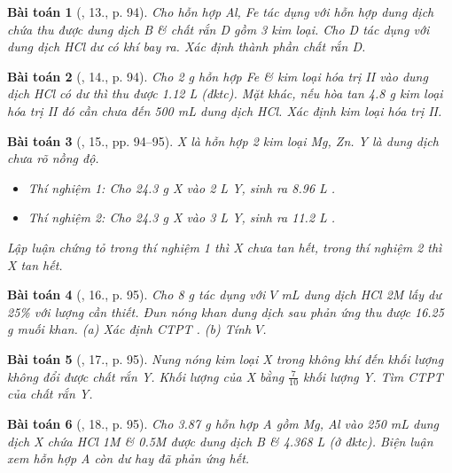 \documentclass{article}
\newtheorem{baitoan}{Bài toán}
\begin{document}
\begin{baitoan}[\cite{An_Hoa_Hoc_nang_cao_8_9}, 13., p. 94]
	Cho hỗn hợp {\rm Al, Fe} tác dụng với hỗn hợp dung dịch chứa {\rm{}} thu được dung dịch B \& chất rắn D gồm 3 kim loại. Cho D tác dụng với dung dịch {\rm HCl} dư có khí bay ra. Xác định thành phần chất rắn D.
\end{baitoan}

\begin{baitoan}[\cite{An_Hoa_Hoc_nang_cao_8_9}, 14., p. 94]
	Cho {\rm2 g} hỗn hợp {\rm Fe} \& kim loại hóa trị II vào dung dịch {\rm HCl} có dư thì thu được {\rm1.12 L } (đktc). Mặt khác, nếu hòa tan {\rm4.8 g} kim loại hóa trị II đó cần chưa đến {\rm500 mL} dung dịch {\rm HCl}. Xác định kim loại hóa trị II.
\end{baitoan}

\begin{baitoan}[\cite{An_Hoa_Hoc_nang_cao_8_9}, 15., pp. 94--95]
	X là hỗn hợp 2 kim loại {\rm Mg, Zn}. Y là dung dịch {\rm{}} chưa rõ nồng độ.
	\begin{itemize}
		\item Thí nghiệm 1: Cho {\rm24.3 g} X vào {\rm2 L} Y, sinh ra {\rm8.96 L }.
		\item Thí nghiệm 2: Cho {\rm24.3 g} X vào {\rm3 L} Y, sinh ra {\rm11.2 L }.
	\end{itemize}
	Lập luận chứng tỏ trong thí nghiệm 1 thì X chưa tan hết, trong thí nghiệm 2 thì X tan hết.
\end{baitoan}

\begin{baitoan}[\cite{An_Hoa_Hoc_nang_cao_8_9}, 16., p. 95]
	Cho {\rm8 g } tác dụng với $V$ {\rm mL} dung dịch {\rm HCl 2M} lấy dư {\rm25\%} với lượng cần thiết. Đun nóng khan dung dịch sau phản ứng thu được {\rm16.25 g} muối khan. (a) Xác định {\rm CTPT} {\rm{}}. (b) Tính $V$.
\end{baitoan}

\begin{baitoan}[\cite{An_Hoa_Hoc_nang_cao_8_9}, 17., p. 95]
	Nung nóng kim loại X trong không khí đến khối lượng không đổi được chất rắn Y. Khối lượng của X bằng $\frac{7}{10}$ khối lượng Y. Tìm {\rm CTPT} của chất rắn Y.
\end{baitoan}

\begin{baitoan}[\cite{An_Hoa_Hoc_nang_cao_8_9}, 18., p. 95]
	Cho {\rm3.87 g} hỗn hợp A gồm {\rm Mg, Al} vào {\rm250 mL} dung dịch X chứa {\rm HCl 1M} \& {\rm{} 0.5M} được dung dịch B \& {\rm4.368 L } (ở đktc). Biện luận xem hỗn hợp A còn dư hay đã phản ứng hết.
\end{baitoan}
\end{document}
